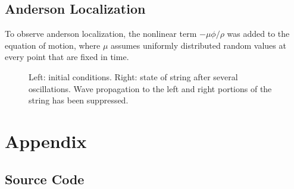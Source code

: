 \documentclass[12pt]{article}
\begin{document}
\subsection{Anderson Localization}

To observe anderson localization, the nonlinear term $-\mu \phi / \rho$ was
added to the equation of motion, where $\mu$ assumes uniformly distributed
random values at every point that are fixed in time.

\begin{figure}[H]
  \caption{Left: initial conditions. Right: state of string after several
    oscillations. Wave propagation to the left and right portions of the string
    has been suppressed.}
\end{figure}

\section*{Appendix}

\subsection*{Source Code}

\inputminted{python}{integrator.py}

\newpage

\inputminted{python}{problem.py}

\newpage

\inputminted{python}{physicalstring.py}

\newpage

\inputminted{python}{stringtest.py}

\newpage

\inputminted{python}{testsuite.py}
\end{document}
